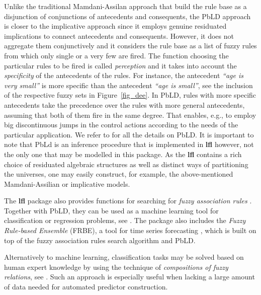\documentclass[review]{elsarticle}
\newcommand{\pkg}[1]{\textbf{#1}}
\newcommand{\proglang}[1]{#1}
\newcommand{\R}{\proglang{R}}
\begin{document}
Unlike the traditional Mamdani-Assilan approach \cite{MamdaniAssilian75} that build the
rule base as a disjunction of conjunctions of antecedents and consequents, the PbLD approach is
closer to the implicative approach \citep{Jones2009, Step_etal_continuity} since it employs genuine residuated implications to connect antecedents and consequents. However, it does not aggregate them conjunctively and it considers the rule base as a list of fuzzy rules from which only single or a very few are fired. The function choosing the particular rules to be fired is called \emph{perception} and it takes into account the  \emph{specificity} of the antecedents of the rules.
For instance, the antecedent \emph{``age is very small''} is more specific than the antecedent \emph{``age is small''}, see the inclusion of the respective fuzzy sets in Figure~\ref{fig_dee}. 
In PbLD, rules with more specific antecedents take the precedence over the rules with more general antecedents, assuming that both of them fire in the same degree. That enables, e.g., to employ big discontinuous jumps in the control actions according to the needs of the particular
application. We refer to \cite{Novak:PbLD,DvoStep:PbLD2015} for all the details on PbLD. It is important to note that PbLd is an inference procedure that is implemented in \pkg{lfl} however, not the only one that may be modelled in this package. As the \pkg{lfl} contains a rich choice of residuated algebraic structures as well as distinct ways of partitioning the universes, one may easily construct, for example, the above-mentioned Mamdani-Assilian or implicative models.





The \pkg{lfl} package also provides functions for searching for \emph{fuzzy association rules} \citep{srikant95}. Together
with PbLD, they can be used as a machine learning tool for classification or regression problems, see \cite{KupkaRusnok:Regression_ESWA_INS17}.
The package also includes the \emph{Fuzzy Rule-based Ensemble} (FRBE), a tool for time series forecasting
\citep{StepBurda:FRBE_FSS}, which is built on top of the fuzzy association rules search algorithm and PbLD.

Alternatively to machine learning, classification tasks may be solved based on human expert knowledge
by using the technique of \emph{compositions of fuzzy relations}, see \cite{Cao2017b,Cao2017,Step_etal:Unavoidable_KNOSYS2020}. Such an approach is especially useful when lacking a large amount of data needed for automated predictor construction.
\end{document}

